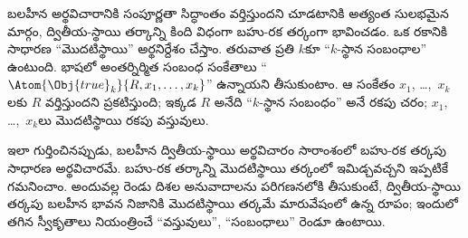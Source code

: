 \documentclass[../../../include/open-logic-section]{subfiles}
\begin{document}
బలహీన అర్థవిచారానికి సంపూర్ణతా సిద్ధాంతం వర్తిస్తుందని చూడటానికి
అత్యంత సులభమైన మార్గం, ద్వితీయ-స్థాయి తర్కాన్ని కింది విధంగా బహు-రక
తర్కంగా భావించడం. ఒక రకానికి సాధారణ ``మొదటిస్థాయి'' 
అర్థనిర్దేశం చేస్తాం. తరువాత ప్రతి $k$కూ ``$k$-స్థాన సంబంధాల''
 ఉంటుంది. భాషలో అంతర్నిర్మిత సంబంధ సంకేతాలు
``$\Atom{\Obj{true}_k}{R,x_1,\dots,x_k}$'' ఉన్నాయని తీసుకుంటాం. ఆ
సంకేతం $x_1$, \dots,~$x_k$లకు $R$ వర్తిస్తుందని ప్రకటిస్తుంది; ఇక్కడ
$R$ అనేది ``$k$-స్థాన సంబంధం'' అనే రకపు చరం; $x_1$, \dots,~$x_k$లు
మొదటిస్థాయి రకపు వస్తువులు.

ఇలా గుర్తించినప్పుడు, బలహీన ద్వితీయ-స్థాయి అర్థవిచారం సారాంశంలో
బహు-రక తర్కపు సాధారణ అర్థవిచారమే. బహు-రక తర్కాన్ని మొదటిస్థాయి
తర్కంలో ఇమిడ్చవచ్చని ఇప్పటికే గమనించాం. అందువల్ల రెండు దిశల
అనువాదాలను పరిగణనలోకి తీసుకుంటే, ద్వితీయ-స్థాయి తర్కపు బలహీన భావన నిజానికి
మొదటిస్థాయి తర్కమే మారువేషంలో ఉన్న రూపం; ఇందులో తగిన స్వీకృతాలు
నియంత్రించే ``వస్తువులు'', ``సంబంధాలు'' రెండూ  ఉంటాయి.
\end{document}
